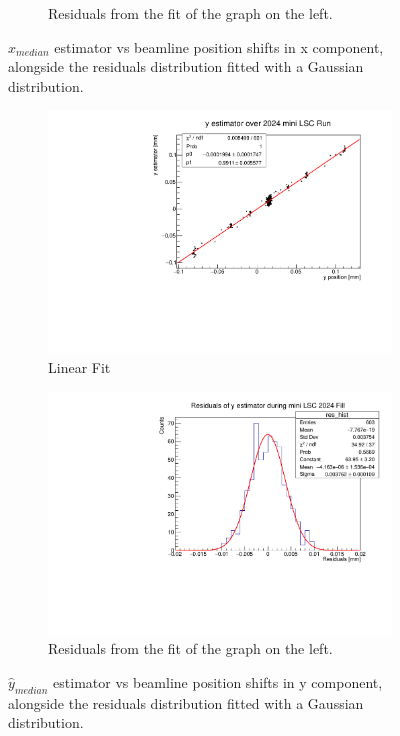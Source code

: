 \begin{figure}
\begin{subfigure}{0.48\textwidth}
    \caption{Residuals from the fit of the graph on the left. }\label{fig:xres_comparison}
    \end{subfigure}
    \caption{$\hat{x}_{median}$ estimator vs beamline position shifts in x component, alongside the residuals distribution fitted with a Gaussian distribution.}
    \label{fig:x_comaprison}
\end{figure}



\begin{figure}
    \centering
    \begin{subfigure}{0.48\textwidth}
    \includegraphics[width=\linewidth]{figures/y_comparison_side.pdf}
    \caption{Linear Fit}\label{fig:yfit_comparison}
    \end{subfigure}
    \begin{subfigure}{0.48\textwidth}
    \includegraphics[width=\linewidth]{figures/y_comparison_res_side.pdf}
    \caption{Residuals from the fit of the graph on the left. }\label{fig:yres_comparison}
    \end{subfigure}
    \caption{$\hat{y}_{median}$ estimator vs beamline position shifts in y component, alongside the residuals distribution fitted with a Gaussian distribution.}
    \label{fig:y_comparison}
\end{figure}


